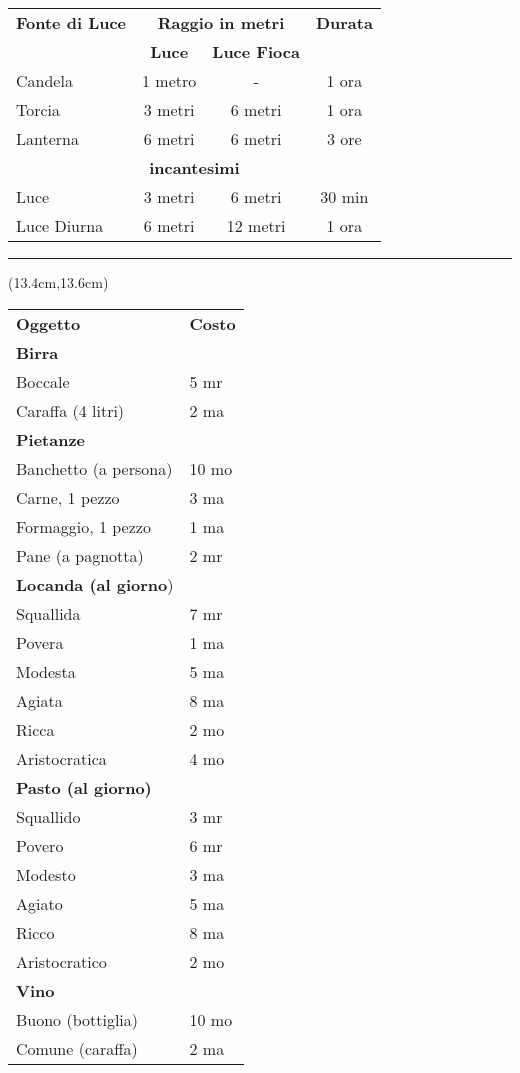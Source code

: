 \documentclass[a4paper,12 pt,openany]{book}
\newcommand{\riga}{\rule{\textwidth}{0.4pt}}
\begin{document}
\begin{textblock*}{12cm}
\begin{tabular}{l|cc|c}
\textbf{Fonte di Luce} &\multicolumn{2}{c}{\textbf{Raggio in metri}}& \textbf{Durata}  \\
& \textbf{Luce} & \textbf{Luce Fioca} &\\
Candela  & 1 metro & -  & 1 ora\\
Torcia & 3 metri & 6 metri  & 1 ora\\
Lanterna & 6 metri & 6 metri  & 3 ore \\
\multicolumn{4}{c}{\textbf{incantesimi}}\\
Luce 		 & 3 metri & 6 metri  &30 min \\
Luce Diurna  & 6 metri & 12 metri & 1 ora \\
\end{tabular}


\riga

\end{textblock*}

\begin{textblock*}{6cm}(13.4cm,13.6cm) %

\begin{tabular}{ll}
\textbf{Oggetto}&\textbf{Costo}\\
\textbf{Birra}&\\
Boccale&5 mr\\
Caraffa (4 litri)&2 ma\\
\textbf{Pietanze} &\\
Banchetto (a persona)&10 mo\\
Carne, 1 pezzo&3 ma\\
Formaggio, 1 pezzo&1 ma\\
Pane (a pagnotta)&2 mr\\
\textbf{Locanda (al giorno})&\\
Squallida&7 mr\\
Povera&1 ma\\
Modesta&5 ma\\
Agiata&8 ma\\
Ricca&2 mo\\
Aristocratica&4 mo\\
\textbf{Pasto (al giorno)}&\\
Squallido&3 mr\\
Povero&6 mr\\
Modesto&3 ma\\
Agiato&5 ma\\
Ricco&8 ma\\
Aristocratico&2 mo\\
\textbf{Vino}&\\
Buono (bottiglia)&10 mo\\
Comune (caraffa)&2 ma\\
\end{tabular}

\end{textblock*}
\end{document}
